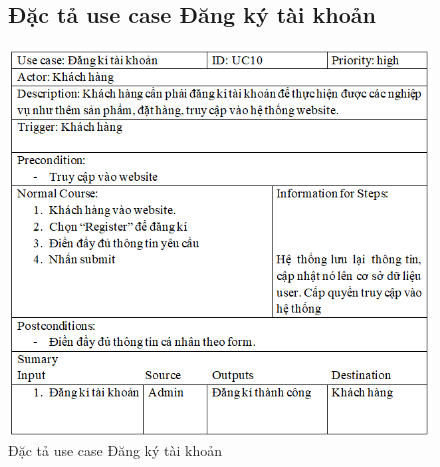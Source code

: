 \documentclass{report}
\begin{document}
\begin{center}
    \begin{figure}[htp]
        \subsection{Đặc tả use case Đăng ký tài khoản}
        \begin{center}
            \includegraphics[scale = 1]{image/UC10.PNG}
        \end{center}
        \caption{Đặc tả use case Đăng ký tài khoản}
        \label{refhinh1}
    \end{figure}
\end{center}
\pagebreak
\end{document}
